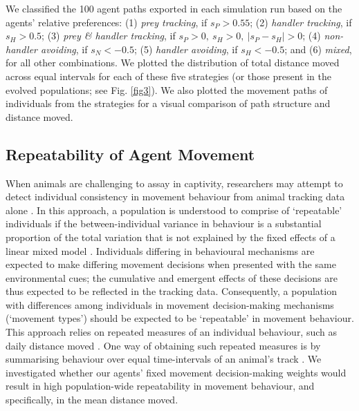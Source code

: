     We classified the 100 agent paths exported in each simulation run based on the agents' relative preferences: (1) \textit{prey tracking}, if $s_P > 0.55$; (2) \textit{handler tracking}, if $s_H > 0.5$; (3) \textit{prey \& handler tracking}, if $s_P > 0,~s_H > 0,~|s_P - s_H| > 0$; (4) \textit{non-handler avoiding}, if $s_N < -0.5$; (5) \textit{handler avoiding}, if $s_H < -0.5$; and (6) \textit{mixed}, for all other combinations.
    We plotted the distribution of total distance moved across equal intervals for each of these five strategies (or those present in the evolved populations; see Fig. \ref{fig3}).
    We also plotted the movement paths of individuals from the strategies for a visual comparison of path structure and distance moved.
    
    \subsection*{Repeatability of Agent Movement}
    
    When animals are challenging to assay in captivity, researchers may attempt to detect individual consistency in movement behaviour from animal tracking data alone \citep[see a review in][see \citealt{hertel2019} for an example]{hertel2020}.
    In this approach, a population is understood to comprise of `repeatable' individuals if the between-individual variance in behaviour is a substantial proportion of the total variation that is not explained by the fixed effects of a linear mixed model \citep[LMM][]{hertel2019}.
    Individuals differing in behavioural mechanisms are expected to make differing movement decisions when presented with the same environmental cues; the cumulative and emergent effects of these decisions are thus expected to be reflected in the tracking data.
    Consequently, a population with differences among individuals in movement decision-making mechanisms (`movement types') should be expected to be `repeatable' in movement behaviour.
    This approach relies on repeated measures of an individual behaviour, such as daily distance moved \citep[][]{niemela2018, hertel2020}.
    One way of obtaining such repeated measures is by summarising behaviour over equal time-intervals of an animal's track \citep[see e.g.][]{hertel2019}.
    We investigated whether our agents' fixed movement decision-making weights would result in high population-wide repeatability in movement behaviour, and specifically, in the mean distance moved.
    
